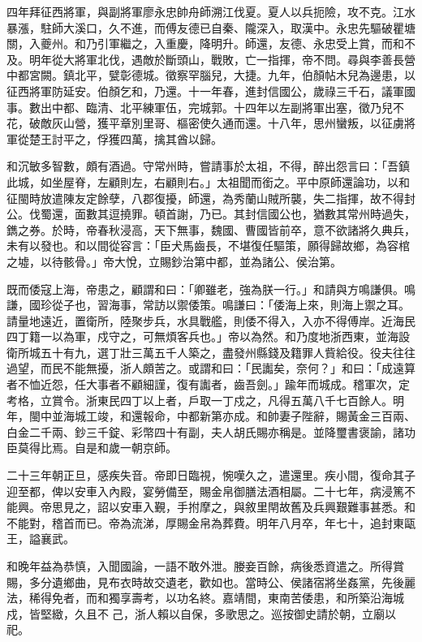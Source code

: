\begin{pinyinscope}
四年拜征西將軍，與副將軍廖永忠帥舟師溯江伐夏。夏人以兵扼險，攻不克。江水暴漲，駐師大溪口，久不進，而傅友德已自秦、隴深入，取漢中。永忠先驅破瞿塘關，入夔州。和乃引軍繼之，入重慶，降明升。師還，友德、永忠受上賞，而和不及。明年從大將軍北伐，遇敵於斷頭山，戰敗，亡一指揮，帝不問。尋與李善長營中都宮闕。鎮北平，甓彰德城。徵察罕腦兒，大捷。九年，伯顏帖木兒為邊患，以征西將軍防延安。伯顏乞和，乃還。十一年春，進封信國公，歲祿三千石，議軍國事。數出中都、臨清、北平練軍伍，完城郭。十四年以左副將軍出塞，徵乃兒不花，破敵灰山營，獲平章別里哥、樞密使久通而還。十八年，思州蠻叛，以征虜將軍從楚王討平之，俘獲四萬，擒其酋以歸。

和沉敏多智數，頗有酒過。守常州時，嘗請事於太祖，不得，醉出怨言曰：「吾鎮此城，如坐屋脊，左顧則左，右顧則右。」太祖聞而銜之。平中原師還論功，以和征閩時放遣陳友定餘孽，八郡復擾，師還，為秀蘭山賊所襲，失二指揮，故不得封公。伐蜀還，面數其逗撓罪。頓首謝，乃已。其封信國公也，猶數其常州時過失，鐫之券。於時，帝春秋浸高，天下無事，魏國、曹國皆前卒，意不欲諸將久典兵，未有以發也。和以間從容言：「臣犬馬齒長，不堪復任驅策，願得歸故鄉，為容棺之墟，以待骸骨。」帝大悅，立賜鈔治第中都，並為諸公、侯治第。

既而倭寇上海，帝患之，顧謂和曰：「卿雖老，強為朕一行。」和請與方鳴謙俱。鳴謙，國珍從子也，習海事，常訪以禦倭策。鳴謙曰：「倭海上來，則海上禦之耳。請量地遠近，置衛所，陸聚步兵，水具戰艦，則倭不得入，入亦不得傅岸。近海民四丁籍一以為軍，戍守之，可無煩客兵也。」帝以為然。和乃度地浙西東，並海設衛所城五十有九，選丁壯三萬五千人築之，盡發州縣錢及籍罪人貲給役。役夫往往過望，而民不能無擾，浙人頗苦之。或謂和曰：「民讟矣，奈何？」和曰：「成遠算者不恤近怨，任大事者不顧細謹，復有讟者，齒吾劍。」踰年而城成。稽軍次，定考格，立賞令。浙東民四丁以上者，戶取一丁戍之，凡得五萬八千七百餘人。明年，閩中並海城工竣，和還報命，中都新第亦成。和帥妻子陛辭，賜黃金三百兩、白金二千兩、鈔三千錠、彩幣四十有副，夫人胡氏賜亦稱是。並降璽書褒諭，諸功臣莫得比焉。自是和歲一朝京師。

二十三年朝正旦，感疾失音。帝即日臨視，惋嘆久之，遣還里。疾小間，復命其子迎至都，俾以安車入內殿，宴勞備至，賜金帛御膳法酒相屬。二十七年，病浸篤不能興。帝思見之，詔以安車入覲，手拊摩之，與敘里閈故舊及兵興艱難事甚悉。和不能對，稽首而已。帝為流涕，厚賜金帛為葬費。明年八月卒，年七十，追封東甌王，謚襄武。

和晚年益為恭慎，入聞國論，一語不敢外泄。媵妾百餘，病後悉資遣之。所得賞賜，多分遺鄉曲，見布衣時故交遺老，歡如也。當時公、侯諸宿將坐姦黨，先後麗法，稀得免者，而和獨享壽考，以功名終。嘉靖間，東南苦倭患，和所築沿海城戍，皆堅緻，久且不己，浙人賴以自保，多歌思之。巡按御史請於朝，立廟以祀。


\end{pinyinscope}
